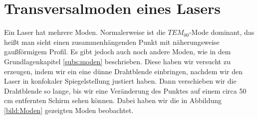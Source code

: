 \section{Transversalmoden eines Lasers}
\label{section:transvM}

Ein Laser hat mehrere Moden. Normalerweise ist die $TEM_{00}$-Mode dominant, das heißt man sieht einen zusammenhängenden 
Punkt mit näherungsweise gaußförmigem Profil. Es gibt jedoch auch noch andere Moden, wie in dem Grundlagenkapitel \ref{subs:moden}
beschrieben. Diese haben wir versucht zu erzeugen, indem wir ein eine dünne Drahtblende einbringen, nachdem wir den Laser in 
konfokaler Spiegelstellung justiert haben. Dann verschieben wir die Drahtblende so lange, bis wir eine Veränderung des Punktes auf einem circa 
50\,cm entfernten Schirm sehen können. Dabei haben wir die in Abbildung \ref{bild:Moden} gezeigten Moden beobachtet.

